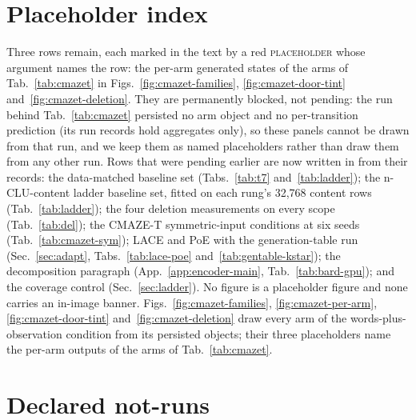 \documentclass{article} %
\begin{document}
\section{Placeholder index}
\label{app:placeholders}

Three rows remain, each marked in the text by a red \textsc{placeholder} whose argument names
the row: the per-arm generated states of the arms of Tab.~\ref{tab:cmazet} in
Figs.~\ref{fig:cmazet-families}, \ref{fig:cmazet-door-tint} and~\ref{fig:cmazet-deletion}. They are
permanently blocked, not pending: the run behind Tab.~\ref{tab:cmazet} persisted no arm object and
no per-transition prediction (its run records hold aggregates only), so these panels cannot be drawn
from that run, and we keep them as named placeholders rather than draw them from any other run. Rows
that were pending earlier are now written in from their records: the data-matched baseline set
(Tabs.~\ref{tab:t7} and~\ref{tab:ladder}); the n-CLU-content ladder baseline set, fitted on each rung's
32,768 content rows (Tab.~\ref{tab:ladder}); the four deletion measurements on every scope %
(Tab.~\ref{tab:del}); the CMAZE-T symmetric-input conditions at six seeds
(Tab.~\ref{tab:cmazet-sym}); LACE and PoE with the generation-table run (Sec.~\ref{sec:adapt},
Tabs.~\ref{tab:lace-poe} and~\ref{tab:gentable-kstar}); the decomposition paragraph
(App.~\ref{app:encoder-main}, Tab.~\ref{tab:bard-gpu}); and the coverage control
(Sec.~\ref{sec:ladder}). No figure is a placeholder figure and none carries an in-image banner.
Figs.~\ref{fig:cmazet-families}, \ref{fig:cmazet-per-arm}, \ref{fig:cmazet-door-tint}
and~\ref{fig:cmazet-deletion} draw every arm of the words-plus-observation condition from its
persisted objects; their three placeholders name the per-arm outputs of the arms of
Tab.~\ref{tab:cmazet}.

\section{Declared not-runs}
\label{app:notrun}
\end{document}
